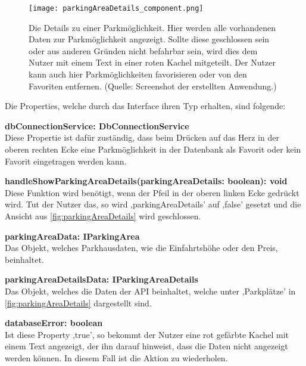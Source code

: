 \begin{figure}[h!]
	\centering
	\texttt{[image: parkingAreaDetails\_component.png]}
	\caption[Die Details zu einer Parkmöglichkeit. Hier werden alle vorhandenen Daten zur Parkmöglichkeit angezeigt. Sollte diese geschlossen sein oder aus anderen Gründen nicht befahrbar sein, wird dies dem Nutzer mit einem Text in einer roten Kachel mitgeteilt. Der Nutzer kann auch hier Parkmöglichkeiten favorisieren oder von den Favoriten entfernen.]
	{Die Details zu einer Parkmöglichkeit. Hier werden alle vorhandenen Daten zur Parkmöglichkeit angezeigt. Sollte diese geschlossen sein oder aus anderen Gründen nicht befahrbar sein, wird dies dem Nutzer mit einem Text in einer roten Kachel mitgeteilt. Der Nutzer kann auch hier Parkmöglichkeiten favorisieren oder von den Favoriten entfernen. (Quelle: Screenshot der erstellten Anwendung.)}
	\label{fig:parkingAreaDetails}
\end{figure}
\newpage
Die Properties, welche durch das Interface ihren Typ erhalten, sind folgende: 
\begin{description}
	\item \textbf{dbConnectionService: DbConnectionService} \\ Diese Propertie ist dafür zuständig, dass beim Drücken auf das Herz in der oberen rechten Ecke eine Parkmöglichkeit in der Datenbank als Favorit oder kein Favorit eingetragen werden kann.
	\item \textbf{handleShowParkingAreaDetails(parkingAreaDetails: boolean): void} \\ Diese Funktion wird benötigt, wenn der Pfeil in der oberen linken Ecke gedrückt wird. Tut der Nutzer das, so wird ,parkingAreaDetails' auf ,false' gesetzt und die Ansicht aus \autoref{fig:parkingAreaDetails} wird geschlossen.
	\item \textbf{parkingAreaData: IParkingArea} \\ Das Objekt, welches Parkhausdaten, wie die Einfahrtshöhe oder den Preis, beinhaltet.
	\item \textbf{parkingAreaDetailsData: IParkingAreaDetails} \\ Das Objekt, welches die Daten der API beinhaltet, welche unter ,Parkplätze' in \autoref{fig:parkingAreaDetails} dargestellt sind.
	\newpage
	\item \textbf{databaseError: boolean} \\ Ist diese Property ,true', so bekommt der Nutzer eine rot gefärbte Kachel mit einem Text angezeigt, der ihn darauf hinweist, dass die Daten nicht angezeigt werden können. In diesem Fall ist die Aktion zu wiederholen.
\end{description}

